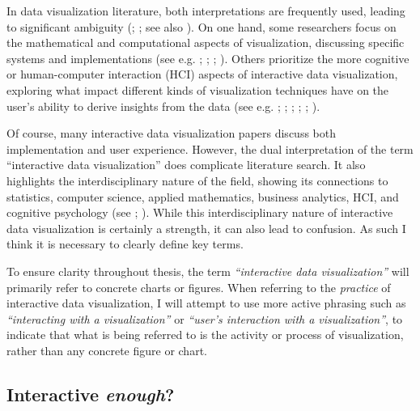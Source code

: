\documentclass[
]{book}
\theoremstyle{definition}
\theoremstyle{definition}
\theoremstyle{definition}
\theoremstyle{definition}
\theoremstyle{remark}
\begin{document}
In data visualization literature, both interpretations are frequently used, leading to significant ambiguity (; ; see also ). On one hand, some researchers focus on the mathematical and computational aspects of visualization, discussing specific systems and implementations (see e.g. ; ; ; ). Others prioritize the more cognitive or human-computer interaction (HCI) aspects of interactive data visualization, exploring what impact different kinds of visualization techniques have on the user's ability to derive insights from the data (see e.g. ; ; ; ; ; ).

Of course, many interactive data visualization papers discuss both implementation and user experience. However, the dual interpretation of the term ``interactive data visualization'' does complicate literature search. It also highlights the interdisciplinary nature of the field, showing its connections to statistics, computer science, applied mathematics, business analytics, HCI, and cognitive psychology (see ; ). While this interdisciplinary nature of interactive data visualization is certainly a strength, it can also lead to confusion. As such I think it is necessary to clearly define key terms.

To ensure clarity throughout thesis, the term \emph{``interactive data visualization''} will primarily refer to concrete charts or figures. When referring to the \emph{practice} of interactive data visualization, I will attempt to use more active phrasing such as \emph{``interacting with a visualization''} or \emph{``user's interaction with a visualization''}, to indicate that what is being referred to is the activity or process of visualization, rather than any concrete figure or chart.

\subsection{\texorpdfstring{Interactive \emph{enough}?}{Interactive enough?}}\label{interactive-enough}
\end{document}
